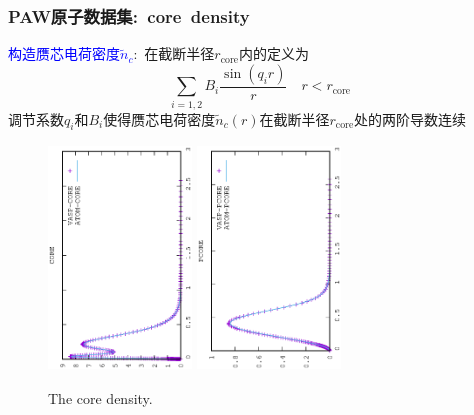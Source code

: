 \documentclass[cjk,slidestop,compress,mathserif,blue]{beamer}
\begin{document}
\frame
{
	\frametitle{\textrm{PAW}原子数据集:~\textrm{core~density}}
	\textcolor{blue}{构造赝芯电荷密度$\tilde n_c$}:~在截断半径$r_{\mathrm{core}}$内的定义为
	$$\sum_{i=1,2}B_i\dfrac{\sin(q_ir)}r\quad r<r_{\mathrm{core}}$$
	调节系数$q_i$和$B_i$使得赝芯电荷密度$\tilde n_c(r)$在截断半径$r_{\mathrm{core}}$处的两阶导数连续
\begin{figure}[h!]
\vskip -0.5in
\centering
\hspace*{-0.1in}
\includegraphics[width=1.5in,height=2.35in,viewport=0 0 350 550, angle=-90, clip]{Figures/CORE_data.eps}
\hspace*{-0.7in}
\includegraphics[height=2.35in,width=1.5in,viewport=0 0 350 550, angle=-90, clip]{Figures/PCORE_data.eps}
\caption{\tiny \textrm{The core density.}}%
\label{core_density_Function}
\end{figure}
}
\end{document}
